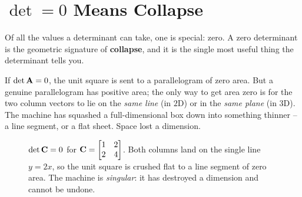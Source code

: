 \section{$\det = 0$ Means Collapse}
\label{ch21:singular}

Of all the values a determinant can take, one is special: zero. A zero determinant
is the geometric signature of \textbf{collapse}, and it is the single most useful
thing the determinant tells you.

If $\det\mathbf{A} = 0$, the unit square is sent to a parallelogram of zero area. But
a genuine parallelogram has positive area; the only way to get area zero is for the
two column vectors to lie on the \emph{same line} (in $2$D) or in the \emph{same
plane} (in $3$D). The machine has squashed a full-dimensional box down into
something thinner -- a line segment, or a flat sheet. Space lost a dimension.

\begin{figure}[H]
\centering
{}
\caption{$\det\mathbf{C}=0$ for $\mathbf{C}=\protect\begin{bmatrix}1&2\\2&4\protect\end{bmatrix}$.
Both columns land on the single line $y=2x$, so the unit square is crushed flat to
a line segment of zero area. The machine is \emph{singular}: it has destroyed a
dimension and cannot be undone.}
\label{ch21:fig-collapse}
\end{figure}

